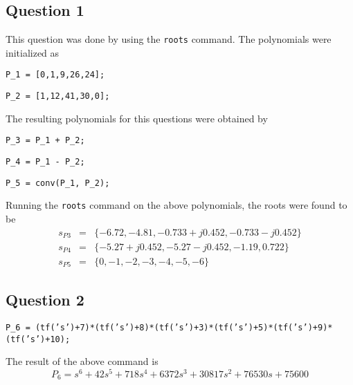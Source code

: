\documentclass[12pt, a4paper]{article}
\begin{document}
		\subsection*{Question 1} %
		\label{sub:question}
			This question was done by using the \texttt{roots} command. The polynomials were initialized as \par
			\texttt{P\_1 = [0,1,9,26,24];} \par
			\texttt{P\_2 = [1,12,41,30,0];}

			\noindent The resulting polynomials for this questions were obtained by \par
			\texttt{P\_3 = P\_1 + P\_2;} \par
			\texttt{P\_4 = P\_1 - P\_2;} \par
			\texttt{P\_5 = conv(P\_1, P\_2);} \par

			\noindent Running the \texttt{roots} command on the above polynomials, the roots were found to be
			\begin{equation*}
				\begin{array}{rcl}
					s_{P3} & = & \{-6.72,-4.81,-0.733 + j0.452, -0.733 - j0.452\} \\
					s_{P4} & = & \{-5.27 + j0.452,-5.27 - j0.452, -1.19, 0.722\} \\
					s_{P5} & = & \{0,-1,-2,-3,-4,-5,-6\}
				\end{array}
			\end{equation*}

		\subsection*{Question 2} %
		\label{sub:question_2}
			\texttt{P\_6 = (tf('s')+7)*(tf('s')+8)*(tf('s')+3)*(tf('s')+5)*(tf('s')+9)*(tf('s')+10);} \par\noindent
			The result of the above command is
			\[
				P_6 = s^6 + 42 s^5 + 718 s^4 + 6372 s^3 + 30817 s^2 + 76530 s + 75600
			\]


\end{document}

